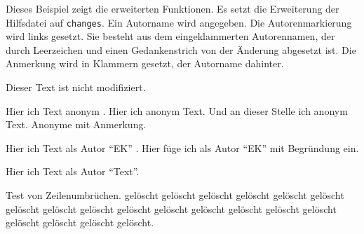 \documentclass[ngerman]{article}
\begin{document}
 Dieses Beispiel zeigt die erweiterten Funktionen.
 Es setzt die Erweiterung der Hilfsdatei auf \texttt{changes}.
 Ein Autorname wird angegeben.
 Die Autorenmarkierung wird links gesetzt.
 Sie besteht aus dem eingeklammerten Autorennamen,
 der durch Leerzeichen und einen Gedankenstrich
 von der Änderung abgesetzt ist.
 Die Anmerkung wird in Klammern gesetzt, der Autorname dahinter.

 \listofchanges

 Dieser Text ist nicht modifiziert.

 Hier  ich Text anonym .
 Hier  ich anonym Text.
 Und an dieser Stelle  ich anonym Text.
 Anonyme  mit Anmerkung.

 Hier  ich Text als Autor "`EK"' .
 Hier füge ich 
 als Autor "`EK"' mit Begründung ein.

 Hier  ich Text
 als Autor "`Text"'.

 Test von Zeilenumbrüchen.
 {gelöscht gelöscht gelöscht gelöscht gelöscht gelöscht
 gelöscht gelöscht gelöscht gelöscht gelöscht gelöscht gelöscht
 gelöscht gelöscht gelöscht gelöscht gelöscht gelöscht.}
\end{document}
